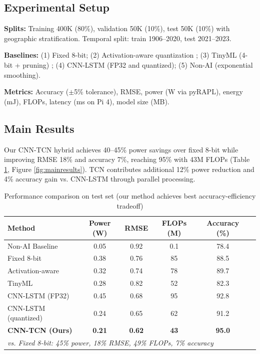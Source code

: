\documentclass[12pt,a4paper]{article}
\begin{document}
\subsection{Experimental Setup}

\textbf{Splits:} Training 400K (80\%), validation 50K (10\%), test 50K (10\%) with geographic stratification. Temporal split: train 1906--2020, test 2021--2023.

\textbf{Baselines:} (1) Fixed 8-bit; (2) Activation-aware quantization \citep{qin2025mixed}; (3) TinyML (4-bit + pruning) \citep{wandb2025qat}; (4) CNN-LSTM (FP32 and quantized); (5) Non-AI (exponential smoothing).

\textbf{Metrics:} Accuracy ($\pm$5\% tolerance), RMSE, power (W via pyRAPL), energy (mJ), FLOPs, latency (ms on Pi 4), model size (MB).

\subsection{Main Results}

Our CNN-TCN hybrid achieves 40--45\% power savings over fixed 8-bit while improving RMSE 18\% and accuracy 7\%, reaching 95\% with 43M FLOPs (Table \ref{tab:mainresults}, Figure \ref{fig:mainresults}). TCN contributes additional 12\% power reduction and 4\% accuracy gain vs. CNN-LSTM through parallel processing.

\begin{table}[ht]
\centering
\caption{Performance comparison on test set (our method achieves best accuracy-efficiency tradeoff)}
\label{tab:mainresults}
\small
\begin{tabular}{lccccc}
\toprule
\textbf{Method} & \textbf{Power (W)} & \textbf{RMSE} & \textbf{FLOPs (M)} & \textbf{Accuracy (\%)} \\
\midrule
Non-AI Baseline & 0.05 & 0.92 & 0.1 & 78.4 \\
Fixed 8-bit & 0.38 & 0.76 & 85 & 88.5 \\
Activation-aware & 0.32 & 0.74 & 78 & 89.7 \\
TinyML & 0.28 & 0.82 & 52 & 82.3 \\
CNN-LSTM (FP32) & 0.45 & 0.68 & 95 & 92.8 \\
CNN-LSTM (quantized) & 0.24 & 0.65 & 62 & 91.2 \\
\textbf{CNN-TCN (Ours)} & \textbf{0.21} & \textbf{0.62} & \textbf{43} & \textbf{95.0} \\
\midrule
\multicolumn{5}{l}{\textit{vs. Fixed 8-bit: 45\% power, 18\% RMSE, 49\% FLOPs, 7\% accuracy}} \\
\bottomrule
\end{tabular}
\end{table}
\end{document}
